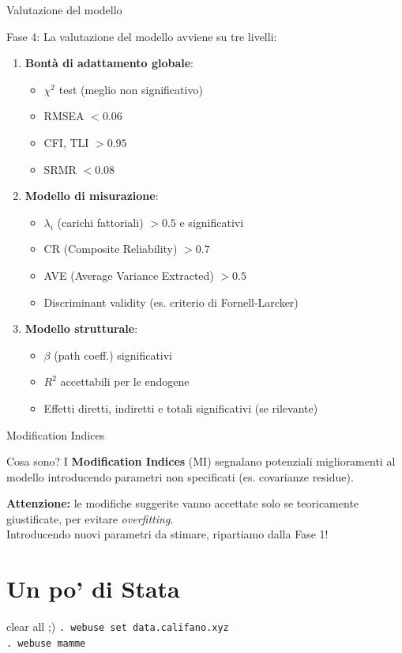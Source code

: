 \documentclass{beamer}
\begin{document}
\begin{frame}{Valutazione del modello}
    \begin{block}{Fase 4:}
        La valutazione del modello avviene su tre livelli:
        \begin{enumerate}
            \item \textbf{Bontà di adattamento globale}:
            \begin{itemize}
                \item $\chi^2$ test (meglio non significativo)
                \item RMSEA $< 0.06$
                \item CFI, TLI $> 0.95$
                \item SRMR $< 0.08$
            \end{itemize}
            \item \textbf{Modello di misurazione}:
            \begin{itemize}
                \item $\lambda_i$ (carichi fattoriali) $> 0.5$ e significativi
                \item CR (Composite Reliability) $> 0.7$
                \item AVE (Average Variance Extracted) $> 0.5$
                \item Discriminant validity (es. criterio di Fornell-Larcker)
            \end{itemize}
            \item \textbf{Modello strutturale}:
            \begin{itemize}
                \item $\beta$ (path coeff.) significativi
                \item $R^2$ accettabili per le endogene
                \item Effetti diretti, indiretti e totali significativi (se rilevante)
            \end{itemize}
        \end{enumerate}
    \end{block}
\end{frame}

\begin{frame}{Modification Indices}
    \begin{block}{Cosa sono?}
        I \textbf{Modification Indices} (MI) segnalano potenziali miglioramenti al modello introducendo parametri non specificati (es. covarianze residue).
    \end{block}
    \vspace{1em}
    \textbf{Attenzione:} le modifiche suggerite vanno accettate solo se teoricamente giustificate, per evitare \textit{overfitting}.\\
    \vspace{1em}
    Introducendo nuovi parametri da stimare, ripartiamo dalla Fase 1!
\end{frame}

\section{Un po' di Stata}
\begin{frame}{clear all ;)}
    \texttt{. webuse set data.califano.xyz} \\
    \texttt{. webuse mamme}
\end{frame}
\end{document}
